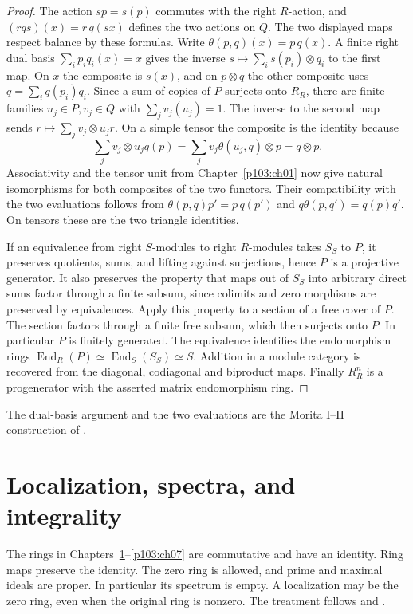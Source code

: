 \documentclass[11pt,oneside,openany]{book}
\theoremstyle{definition}
\theoremstyle{remark}
\begin{document}
\begin{proof}
The action \(sp=s(p)\) commutes with the right \(R\)-action,
and \((rqs)(x)=r\,q(sx)\) defines the two actions on \(Q\).
The two displayed maps respect balance by these formulas.
Write \(\theta(p,q)(x)=p\,q(x)\). A finite right dual basis
\(\sum_i p_iq_i(x)=x\) gives the inverse
\(s\mapsto\sum_i s(p_i)\otimes q_i\) to the first map.
On \(x\) the composite is \(s(x)\), and on \(p\otimes q\) the
other composite uses \(q=\sum_i q(p_i)q_i\).
Since a sum of copies of \(P\) surjects onto \(R_R\),
there are finite families \(u_j\in P,v_j\in Q\) with
\(\sum_j v_j(u_j)=1\). The inverse to the second map sends
\(r\mapsto\sum_j v_j\otimes u_jr\).
On a simple tensor the composite is the identity because
\[
 \sum_j v_j\otimes u_jq(p)
 =\sum_j v_j\theta(u_j,q)\otimes p=q\otimes p.
\]
Associativity and the tensor unit from Chapter~\ref{p103:ch01}
now give natural isomorphisms for both composites of the two
functors. Their compatibility with the two evaluations follows
from \(\theta(p,q)p'=p\,q(p')\) and
\(q\theta(p,q')=q(p)q'\). On tensors these are the two triangle
identities.

If an equivalence from right \(S\)-modules to right \(R\)-modules
takes \(S_S\) to \(P\), it preserves quotients, sums, and lifting
against surjections, hence \(P\) is a projective generator.
It also preserves the property that maps out of \(S_S\) into
arbitrary direct sums factor through a finite subsum, since
colimits and zero morphisms are preserved by equivalences.
Apply this property to a section of a free cover of \(P\).
The section factors through a finite free subsum, which then
surjects onto \(P\). In particular \(P\) is finitely generated.
The equivalence identifies the endomorphism rings
\(\operatorname{End}_R(P)\simeq\operatorname{End}_S(S_S)\simeq S\).
Addition in a module category is recovered from the diagonal,
codiagonal and biproduct maps. Finally \(R^n_R\) is a
progenerator with the asserted matrix endomorphism ring.
\end{proof}
The dual-basis argument and the two evaluations are the
Morita I--II construction of \cite[Sections 17B and 18B--18D]{lam}.
\chapter{Localization, spectra, and integrality}
\label{p103:ch04}

The rings in Chapters~\ref{p103:ch04}--\ref{p103:ch07} are commutative and have an identity. Ring maps preserve the identity. The zero ring is allowed, and prime and maximal ideals are proper. In particular its spectrum is empty. A localization may be the zero ring, even when the original ring is nonzero. The treatment follows \cite[Chapters 2 and 4 and Section 13.1]{eisenbud} and \cite[Sections 15.4--15.5]{dummit}.
\end{document}
